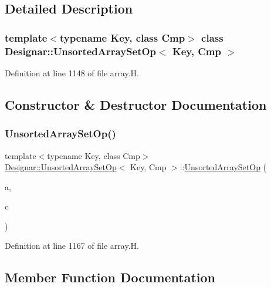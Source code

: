 \subsection{Detailed Description}
\subsubsection*{template$<$typename Key, class Cmp$>$\newline
class Designar\+::\+Unsorted\+Array\+Set\+Op$<$ Key, Cmp $>$}



Definition at line 1148 of file array.\+H.



\subsection{Constructor \& Destructor Documentation}
\mbox{\label{class_designar_1_1_unsorted_array_set_op_a3f01d03aaf449273fd884809764cf841}} 
\subsubsection{\texorpdfstring{Unsorted\+Array\+Set\+Op()}{UnsortedArraySetOp()}}
{\footnotesize\ttfamily template$<$typename Key, class Cmp$>$ \\
\hyperlink{class_designar_1_1_unsorted_array_set_op}{Designar\+::\+Unsorted\+Array\+Set\+Op}$<$ Key, Cmp $>$\+::\hyperlink{class_designar_1_1_unsorted_array_set_op}{Unsorted\+Array\+Set\+Op} (\begin{DoxyParamCaption}\item[{\hyperlink{class_designar_1_1_dyn_array}{Dyn\+Array}$<$ Key $>$ \&}]{a,  }\item[{Cmp \&}]{c }\end{DoxyParamCaption})\hspace{0.3cm}{\ttfamily [inline]}}



Definition at line 1167 of file array.\+H.



\subsection{Member Function Documentation}
\mbox{\label{class_designar_1_1_unsorted_array_set_op_adaba74cc7cc8541af17b7324b9ac3eb4}} 
